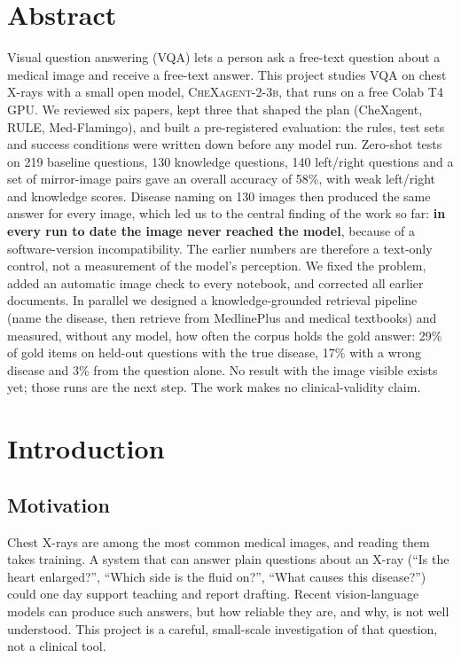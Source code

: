 \documentclass[11pt,a4paper]{article}
\begin{document}
\section*{Abstract}
Visual question answering (VQA) lets a person ask a free-text question about a medical image and receive a free-text answer.
This project studies VQA on chest X-rays with a small open model, \textsc{CheXagent-2-3b}, that runs on a free Colab T4 GPU.
We reviewed six papers, kept three that shaped the plan (CheXagent, RULE, Med-Flamingo), and built a pre-registered
evaluation: the rules, test sets and success conditions were written down before any model run.
Zero-shot tests on 219 baseline questions, 130 knowledge questions, 140 left/right questions and a set of mirror-image
pairs gave an overall accuracy of 58\%, with weak left/right and knowledge scores.
Disease naming on 130 images then produced the same answer for every image, which led us to the central finding of the
work so far: \textbf{in every run to date the image never reached the model}, because of a software-version
incompatibility. The earlier numbers are therefore a text-only control, not a measurement of the model's perception.
We fixed the problem, added an automatic image check to every notebook, and corrected all earlier documents.
In parallel we designed a knowledge-grounded retrieval pipeline (name the disease, then retrieve from MedlinePlus and medical
textbooks) and measured, without any model, how often the corpus holds the gold answer: 29\% of gold items on held-out
questions with the true disease, 17\% with a wrong disease and 3\% from the question alone.
No result with the image visible exists yet; those runs are the next step. The work makes no clinical-validity claim.

\tableofcontents
\clearpage
\listoffigures
\clearpage
{}

\section{Introduction}
\subsection{Motivation}
Chest X-rays are among the most common medical images, and reading them takes training.
A system that can answer plain questions about an X-ray (``Is the heart enlarged?'', ``Which side is the fluid on?'',
``What causes this disease?'') could one day support teaching and report drafting.
Recent vision-language models can produce such answers, but how reliable they are, and why, is not well understood.
This project is a careful, small-scale investigation of that question, not a clinical tool.
\end{document}
